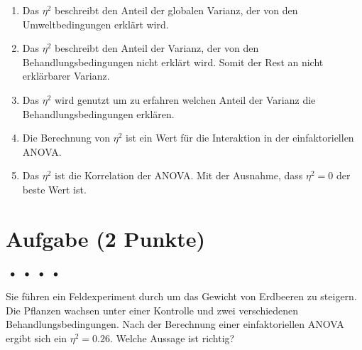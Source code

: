 \documentclass[a4paper, 9pt]{scrartcl}\usepackage[]{graphicx}\usepackage[]{xcolor}
\begin{document}
\begin{enumerate}
\item [\textbf{A} \msquare] Das $\eta^2$ beschreibt den Anteil der globalen Varianz, der von den Umweltbedingungen erklärt wird.
\item [\textbf{B} \msquare] Das $\eta^2$ beschreibt den Anteil der Varianz, der von den Behandlungsbedingungen nicht erklärt wird. Somit der Rest an nicht erklärbarer Varianz.
\item [\textbf{C} \msquare] Das $\eta^2$ wird genutzt um zu erfahren welchen Anteil der Varianz die Behandlungsbedingungen erklären.
\item [\textbf{D} \msquare] Die Berechnung von $\eta^2$ ist ein Wert für die Interaktion in der einfaktoriellen ANOVA.
\item [\textbf{E} \msquare] Das $\eta^2$ ist die Korrelation der ANOVA. Mit der Ausnahme, dass $\eta^2 = 0$ der beste Wert ist.
\end{enumerate}

\section{Aufgabe \hfill (2 Punkte)}

\ifcollection
\begin{flushright}
\tiny\vspace{-2Ex}
\textbf{\examinhaltstart}
\exammodulemathstat $\;\bullet$
\exammodulestat $\;\bullet$
\exammodulestatbbv $\;\bullet$
\exammodulestatversuch $\;\bullet$
\exammodulebiostat
\vspace{-1Ex}
\end{flushright}
\fi







Sie führen ein Feldexperiment durch um das Gewicht von Erdbeeren zu steigern. Die Pflanzen wachsen unter einer Kontrolle und zwei verschiedenen Behandlungsbedingungen. Nach der Berechnung einer einfaktoriellen ANOVA ergibt sich ein $\eta^2 = 0.26$. Welche Aussage ist richtig?
\end{document}
